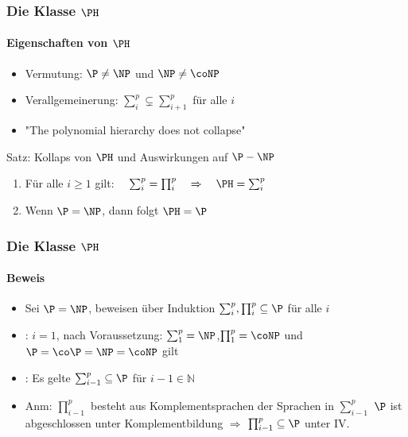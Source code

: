 \begin{frame} 
	\frametitle{Die Klasse $\PH$}
	\framesubtitle{Eigenschaften von $\PH$}
	
	\begin{itemize}[<+->]
		\item Vermutung: $\P \neq \NP$ und $\NP \neq \coNP$	
		\item Verallgemeinerung:    $\sum_{i}^{p}  \subsetneq \sum_{i+1}^{p}$ für alle $i$
		\item "The polynomial hierarchy does not collapse"
	\end{itemize}
	\bigskip
	\pause
	\begin{KITinfoblock}{Satz: Kollaps von $\PH$ und Auswirkungen auf $\P-\NP$}
		\begin{enumerate}[<+->]
			\item Für alle $ i \geq 1$ gilt: $ \quad \sum_{i}^{p} = \prod_{i}^{p} \quad \Rightarrow \quad \PH = \sum_{i}^{p}$
			\item Wenn $\P = \NP$, dann folgt $\PH = \P$
		\end{enumerate}
	\end{KITinfoblock}
\end{frame}
\begin{frame} 
	\frametitle{Die Klasse $\PH$}
	\framesubtitle{Beweis}
	\begin{itemize}[<+->]
		\item Sei $\P = \NP$, beweisen über Induktion $\sum_{i}^{p},\prod_{i}^{p} \subseteq \P$ für alle $i$
		\bigskip
		\item {}: $i=1$, nach Voraussetzung: $\sum_{1}^{p} = \NP$,\quad$\prod_{1}^{p} = \coNP$ \newline
				und $\P = \co\P = \NP = \coNP$ gilt
		\bigskip
		\item {}: Es gelte  $\sum_{i-1}^{p} \subseteq \P$ für $i-1 \in \mathbb{N}$  
		\item Anm: $\prod_{i-1}^{p}$ besteht aus Komplementsprachen der Sprachen in $\sum_{i-1}^{p}$ \newline $\P$ ist abgeschlossen unter Komplementbildung $\Rightarrow$  $\prod_{i-1}^{p} \subseteq \P$ unter IV.
		
	 
		
	\end{itemize}
\end{frame} 

